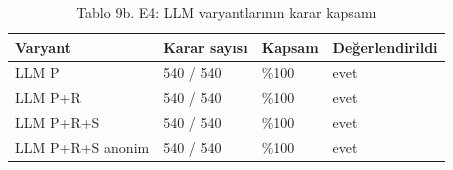 \begin{table}
\caption{Tablo 9b. E4: LLM varyantlarının karar kapsamı}
\label{tab:tablo_09b_e4_llm_kapsam}
\begin{tabular}{llll}
\toprule
Varyant & Karar sayısı & Kapsam & Değerlendirildi \\
\midrule
LLM P & 540 / 540 & \%100 & evet \\
LLM P+R & 540 / 540 & \%100 & evet \\
LLM P+R+S & 540 / 540 & \%100 & evet \\
LLM P+R+S anonim & 540 / 540 & \%100 & evet \\
\bottomrule
\end{tabular}
\end{table}
